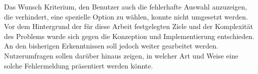 Das Wunsch Kriterium,
den Benutzer auch die fehlerhafte Auswahl anzuzeigen,
die verhindert,
eine spezielle Option zu wählen,
konnte nicht umgesetzt werden.
Vor dem Hintergrund der für diese Arbeit festgelegten Ziele
und der Komplexität des Problems wurde sich gegen die Konzeption und Implementierung entschieden.
An den bisherigen Erkenntnissen soll jedoch weiter gearbeitet werden.
Nutzerumfragen sollen darüber hinaus zeigen,
in welcher Art und Weise eine solche Fehlermeldung präsentiert werden könnte.

 